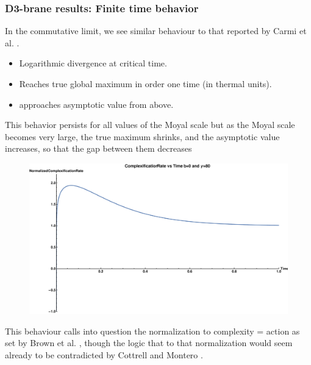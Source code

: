 \documentclass[8pt,aspectratio=169]{beamer}
\begin{document}
\begin{frame}
\frametitle{D3-brane results: Finite time behavior}

In the commutative limit, we see similar behaviour to that reported by Carmi et al. \cite{Carmi:2017jqz}.

\begin{minipage}[t]{0.48\linewidth}

\begin{itemize}

\item Logarithmic divergence at critical time.

\item Reaches true global maximum in order one time (in thermal units).

\item approaches asymptotic value from above.

\end{itemize}

This behavior persists for all values of the Moyal scale  but as the Moyal scale becomes very large, the true maximum shrinks, and the asymptotic value increases, so that the gap between them decreases

\end{minipage}
%
\begin{minipage}[t]{0.48\linewidth}

\begin{figure}
    \begin{center}
        \includegraphics[scale=0.15]{FiniteTime1}
    \end{center}
\end{figure}

\end{minipage}
\vspace{5mm}

This behaviour calls into question the normalization to complexity = action as set by Brown et al. \cite{Brown:2015bva, Brown:2015lvg} , though the logic that to that normalization would seem already to be contradicted by Cottrell and Montero \cite{Cottrell:2017ayj}.

\end{frame}
\end{document}
